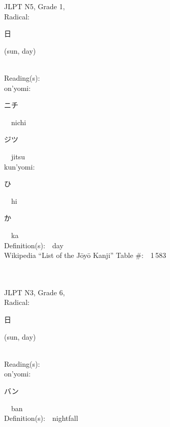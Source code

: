 \begin{multicols}{2}
{JLPT N5, Grade 1, \\Radical:\ \ {\begin{CJK}{UTF8}{min} 日 \end{CJK}} (sun, day) } \\
Reading(s):\ \ \\
{\hspace*{1em}}on'yomi:\ \ \\
{\hspace*{2em}}{\begin{CJK}{UTF8}{min} ニチ \end{CJK}}\ \ nichi\ \ \\
{\hspace*{2em}}{\begin{CJK}{UTF8}{min} ジツ \end{CJK}}\ \ jitsu\ \ \\
{\hspace*{1em}}kun'yomi:\ \ \\
{\hspace*{2em}}{\begin{CJK}{UTF8}{min} ひ \end{CJK}}\ \ hi\ \ \\
{\hspace*{2em}}{\begin{CJK}{UTF8}{min} か \end{CJK}}\ \ ka\ \ \\
Definition(s):\ \ day \\
Wikipedia ``List of the J\=oy\=o Kanji'' Table \#:\ \ 1\,583 \\
\ \ \\
{\fontsize{34pt}{40pt}  }\ \ \\  %
{JLPT N3, Grade 6, \\Radical:\ \ {\begin{CJK}{UTF8}{min} 日 \end{CJK}} (sun, day) } \\
Reading(s):\ \ \\
{\hspace*{1em}}on'yomi:\ \ \\
{\hspace*{2em}}{\begin{CJK}{UTF8}{min} バン \end{CJK}}\ \ ban\ \ \\
Definition(s):\ \ nightfall \\

\end{multicols}
